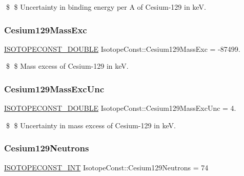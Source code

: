 \$ \$ Uncertainty in binding energy per A of Cesium-\/129 in keV. \mbox{\label{group___isotope_const-_cesium-_cs129_gac45fe4a6d66f1b82b34288364e511224}} 
\subsubsection{\texorpdfstring{Cesium129\+Mass\+Exc}{Cesium129MassExc}}
{\footnotesize\ttfamily \mbox{\hyperlink{group___isotope_const-_macros_ga8f45a7272ce02c0b4c65c44636ed719a}{I\+S\+O\+T\+O\+P\+E\+C\+O\+N\+S\+T\+\_\+\+D\+O\+U\+B\+LE}} Isotope\+Const\+::\+Cesium129\+Mass\+Exc = -\/87499.}

\$ \$ Mass excess of Cesium-\/129 in keV. \mbox{\label{group___isotope_const-_cesium-_cs129_gab97d240347ad9603e7c7e8aac6165bfb}} 
\subsubsection{\texorpdfstring{Cesium129\+Mass\+Exc\+Unc}{Cesium129MassExcUnc}}
{\footnotesize\ttfamily \mbox{\hyperlink{group___isotope_const-_macros_ga8f45a7272ce02c0b4c65c44636ed719a}{I\+S\+O\+T\+O\+P\+E\+C\+O\+N\+S\+T\+\_\+\+D\+O\+U\+B\+LE}} Isotope\+Const\+::\+Cesium129\+Mass\+Exc\+Unc = 4.}

\$ \$ Uncertainty in mass excess of Cesium-\/129 in keV. \mbox{\label{group___isotope_const-_cesium-_cs129_gaa60c12eb1cdd73e974636077c01df070}} 
\subsubsection{\texorpdfstring{Cesium129\+Neutrons}{Cesium129Neutrons}}
{\footnotesize\ttfamily \mbox{\hyperlink{group___isotope_const-_macros_ga5f18360b3e99483a35c32d789e62621c}{I\+S\+O\+T\+O\+P\+E\+C\+O\+N\+S\+T\+\_\+\+I\+NT}} Isotope\+Const\+::\+Cesium129\+Neutrons = 74}

